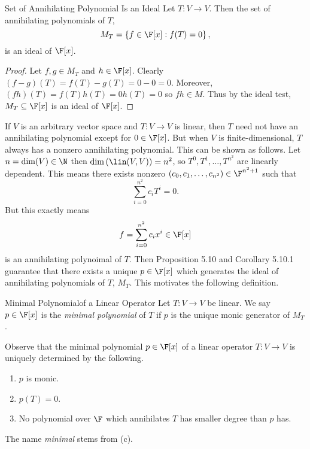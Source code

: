 \documentclass[linearalgebra]{subfiles}
\begin{document}
    \begin{prop}{Set of Annihilating Polynomial Is an Ideal}
        Let $T:V\to V$. Then the set of annihilating polynomials of $T$,
        \begin{equation*}
            M_T = \left\lbrace f\in\F[x]:f(T)=0 \right\rbrace ,
        \end{equation*}
        is an ideal of $\F[x]$.
    \end{prop}

    \begin{proof}
        Let $f,g\in M_T$ and $h\in \F[x]$. Clearly $(f-g)(T) = f(T)-g(T) = 0 - 0 = 0$. Moreover, $(fh)(T) = f(T)h(T) = 0h(T) = 0$ so $fh\in M$. Thus by the ideal test, $M_T\subseteq\F[x]$ is an ideal of $\F[x]$.
    \end{proof}

    \begin{remark}
        If $V$ is an arbitrary vector space and $T:V\to V$ is linear, then $T$ need not have an annihilating polynomial except for $0\in\F[x]$. But when $V$ is finite-dimensional, $T$ always has a nonzero annihilating polynomial. This can be shown as follows. Let $n=\dim(V)\in\N$ then $\dim\left( \lin(V,V) \right) = n^2$, so $T^0, T^1, \ldots, T^{n^2}$ are linearly dependent. This means there exists nonzero $\left( c_0,c_1,\ldots,c_{n^2} \right) \in\F^{n^2+1}$ such that
        \begin{equation*}
            \sum^{n^2}_{i=0} c_iT^i = 0.
        \end{equation*}
        But this exactly means
        \begin{equation*}
            f = \sum^{n^2}_{i=0} c_ix^i \in\F[x]
        \end{equation*}
        is an annihilating polynoimal of $T$. Then Proposition 5.10 and Corollary 5.10.1 guarantee that there exists a unique $p\in\F[x]$ which generates the ideal of annihilating polynomials of $T$, $M_T$. This motivates the following definition.
    \end{remark}

    \begin{definition}{Minimal Polynomial}{of a Linear Operator}
        Let $T:V\to V$ be linear. We say $p\in\F[x]$ is the \emph{minimal polynomial} of $T$ if $p$ is the unique monic generator of $M_T$.
    \end{definition}

    \begin{remark}
        Observe that the minimal polynomial $p\in\F[x]$ of a linear operator $T:V\to V$ is uniquely determined by the following.
        \begin{enumerate}
            \item $p$ is monic.
            \item $p(T)=0$.
            \item No polynomial over $\F$ which annihilates $T$ has smaller degree than $p$ has.
        \end{enumerate}
        The name \textit{minimal} stems from (c).
    \end{remark}
\end{document}
